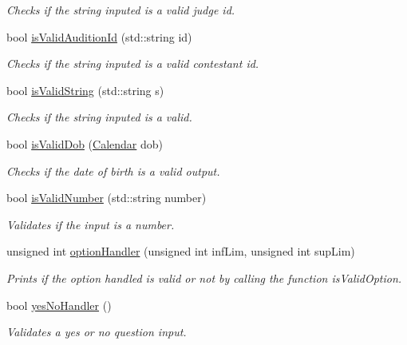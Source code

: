 \begin{DoxyCompactItemize}
\begin{DoxyCompactList}\small\item\em Checks if the string inputed is a valid judge id. \end{DoxyCompactList}\item 
bool \hyperlink{class_company_m_s_a7d66e2ba526b647b95362c1c7a7e6f48}{is\+Valid\+Audition\+Id} (std\+::string id)
\begin{DoxyCompactList}\small\item\em Checks if the string inputed is a valid contestant id. \end{DoxyCompactList}\item 
bool \hyperlink{class_company_m_s_ade9c43ad96fb8806d1c76b0daae66cee}{is\+Valid\+String} (std\+::string s)
\begin{DoxyCompactList}\small\item\em Checks if the string inputed is a valid. \end{DoxyCompactList}\item 
bool \hyperlink{class_company_m_s_a030d1058d9196c1ac5cf1033e95e83c4}{is\+Valid\+Dob} (\hyperlink{class_calendar}{Calendar} dob)
\begin{DoxyCompactList}\small\item\em Checks if the date of birth is a valid output. \end{DoxyCompactList}\item 
bool \hyperlink{class_company_m_s_a3536b19cdf6f981d44f0fc2a6ff6446b}{is\+Valid\+Number} (std\+::string number)
\begin{DoxyCompactList}\small\item\em Validates if the input is a number. \end{DoxyCompactList}\item 
unsigned int \hyperlink{class_company_m_s_a91f5627674f301e51beb79eb6827e4d9}{option\+Handler} (unsigned int inf\+Lim, unsigned int sup\+Lim)
\begin{DoxyCompactList}\small\item\em Prints if the option handled is valid or not by calling the function is\+Valid\+Option. \end{DoxyCompactList}\item 
bool \hyperlink{class_company_m_s_a60ab36821370917191ec31d3a220bc0a}{yes\+No\+Handler} ()
\begin{DoxyCompactList}\small\item\em Validates a yes or no question input. \end{DoxyCompactList}\item 

\end{DoxyCompactItemize}
